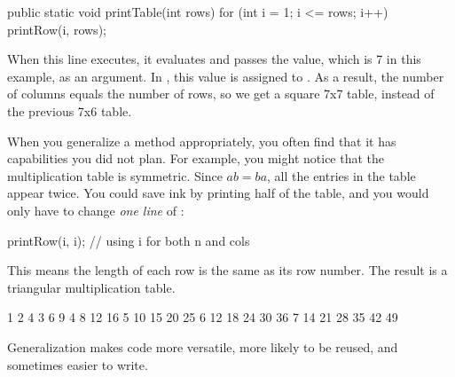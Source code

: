 \begin{code}
public static void printTable(int rows) {
    for (int i = 1; i <= rows; i++) {
        printRow(i, rows);
    }
}
\end{code}

When this line executes, it evaluates  and passes the value, which is 7 in this example, as an argument.
In , this value is assigned to .
As a result, the number of columns equals the number of rows, so we get a square 7x7 table, instead of the previous 7x6 table.


When you generalize a method appropriately, you often find that it has capabilities you did not plan.
For example, you might notice that the multiplication table is symmetric.
Since $ab = ba$, all the entries in the table appear twice.
You could save ink by printing half of the table, and you would only have to change {\em one line} of :

\begin{code}
printRow(i, i);  // using i for both n and cols
\end{code}

This means the length of each row is the same as its row number.
The result is a triangular multiplication table.

\begin{stdout}
   1
   2   4
   3   6   9
   4   8  12  16
   5  10  15  20  25
   6  12  18  24  30  36
   7  14  21  28  35  42  49
\end{stdout}

Generalization makes code more versatile, more likely to be reused, and sometimes easier to write.




